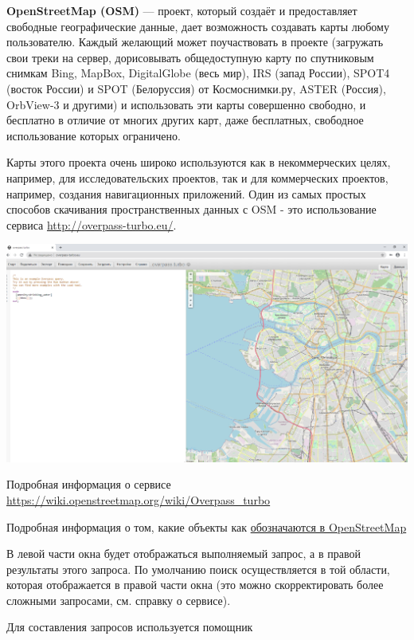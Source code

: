 \documentclass[
]{book}
\begin{document}
\textbf{OpenStreetMap (OSM)} --- проект, который создаёт и предоставляет свободные географические данные, дает возможность создавать карты любому пользователю. Каждый желающий может поучаствовать в проекте (загружать свои треки на сервер, дорисовывать общедоступную карту по спутниковым снимкам Bing, MapBox, DigitalGlobe (весь мир), IRS (запад России), SPOT4 (восток России) и SPOT (Белоруссия) от Космоснимки.ру, ASTER (Россия), OrbView-3 и другими) и использовать эти карты совершенно свободно, и бесплатно в отличие от многих других карт, даже бесплатных, свободное использование которых ограничено.

Карты этого проекта очень широко используются как в некоммерческих целях, например, для исследовательских проектов, так и для коммерческих проектов, например, создания навигационных приложений. Один из самых простых способов скачивания пространственных данных с OSM - это использование сервиса \url{http://overpass-turbo.eu/}.

\includegraphics{figures/32.png}

Подробная информация о сервисе \href{https://wiki.openstreetmap.org/wiki/Overpass_turbo}{\underline{https://wiki.openstreetmap.org/wiki/Overpass\_turbo}}

Подробная информация о том, какие объекты как \href{https://wiki.openstreetmap.org/wiki/RU:\%D0\%9E\%D0\%B1\%D1\%8A\%D0\%B5\%D0\%BA\%D1\%82\%D1\%8B_\%D0\%BA\%D0\%B0\%D1\%80\%D1\%82\%D1\%8B}{обозначаются в OpenStreetMap}

В левой части окна будет отображаться выполняемый запрос, а в правой результаты этого запроса. По умолчанию поиск осуществляется в той области, которая отображается в правой части окна (это можно скорректировать более сложными запросами, см. справку о сервисе).

Для составления запросов используется помощник
\end{document}
